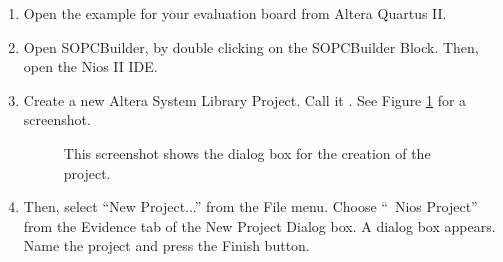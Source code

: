 \begin{enumerate}
\item Open the  example for your evaluation board from
  Altera Quartus II.
\item Open SOPCBuilder, by double clicking on the SOPCBuilder
  Block. Then, open the Nios II IDE.
\item Create a new Altera System Library Project. Call it
  . See Figure \ref{fig:lwip_system_library}
  for a screenshot.
%
\begin{figure}

\caption{\label{fig:lwip_system_library}This screenshot shows the
dialog box for the creation of the  project.}
\end{figure}
%
\item Then, select ``New Project...''  from the File menu. Choose
  ``\rtd\ Nios Project'' from the Evidence tab of the New Project
  Dialog box. A dialog box appears.  Name the project 
  and press the Finish button.
%
\begin{figure}


\end{figure}
\end{enumerate}

